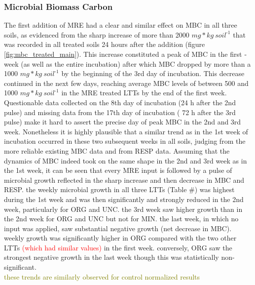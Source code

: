 \documentclass[12pt]{report}
\newcommand{\myRed}[1]{\textcolor{red}{#1}} %
\newcommand{\myGreen}[1]{\textcolor{olive}{#1}} %
\newlength{\SpaceAfterUnit}
\newcommand{\genericunit}{$ mg * kg\ soil^{\text{-}1}$ \hspace*{\SpaceAfterUnit}}
\begin{document}
	\subsubsection{Microbial Biomass Carbon}
		The first addition of MRE had a clear and similar effect on MBC in all three soils, as evidenced from the sharp increase of more than 2000 \genericunit that was recorded in all treated soils 24 hours after the addition (figure \ref{fig:mbc_treated_main}). This increase constituted a peak of MBC in the first ­week (as well as the entire incubation) after which MBC dropped by more than a 1000 \genericunit by the beginning of the 3rd day of incubation. This decrease continued in the next few days, reaching average MBC levels of between 500 and 1000 \genericunit in the MRE treated LTTs by the end of the first week. Questionable data collected on the 8th day of incubation (24 h after the 2nd pulse) and missing data from the 17th day of incubation ( 72 h after the 3rd pulse)  make it hard to assert the precise day of peak MBC in the 2nd and 3rd  week. Nonetheless it is highly plausible that a similar trend as in the 1st week of incubation occurred in these two subsequent weeks in all soils, judging from  the more reliable existing MBC data and from RESP data.
		Assuming that the dynamics of MBC indeed took on the same shape in the 2nd and 3rd week as in the 1st week, it can be seen that every MRE input is followed by a pulse of microbial growth reflected in the sharp increase and then decrease in MBC and RESP.
		the weekly microbial growth in all three LTTs (Table \#) was highest during the 1st week and was then significantly and strongly reduced in the 2nd week,  particularly for ORG and UNC. the 3rd week saw higher growth than in the 2nd week for ORG and UNC but not for MIN. the last week, in which no input was applied, saw substantial negative growth (net decrease in MBC). weekly growth was significantly higher in ORG compared with the two other LTTs \myRed{(which had similar values)} in the first week. conversely, ORG saw the strongest negative growth in the last week though this was statistically non-significant. \\
		\myGreen{these trends are similarly observed for control normalized results}\\
\end{document}
